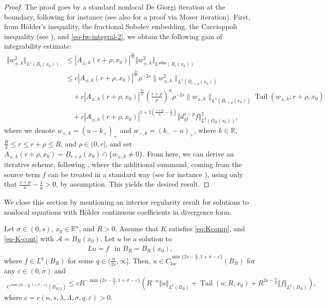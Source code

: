 \documentclass[11pt,reqno]{amsart}
\theoremstyle{plain}
\theoremstyle{definition}
\numberwithin{equation}{section}
\newcommand{\R}{\mathbb{R}}
\newcommand{\eps}{\varepsilon}
\newcommand{\1}{\mathbbm{1}}
\DeclareMathOperator{\tail}{Tail}
\begin{document}
\begin{proof}
    The proof goes by a standard nonlocal De Giorgi iteration at the boundary, following for instance \cite[Theorem~5]{KKP16} (see also \cite[Theorem~3.1]{KiLe23} for a proof via Moser iteration). First, from H\"older's inequality,  the fractional Sobolev embedding, the Caccioppoli inequality (see \cite[Lemma 4]{KKP16}), and \eqref{eq-fw-integral-2}, we obtain the following gain of integrability estimate:
    \begin{align*}
        \Vert w_{\pm,k}^2 \Vert_{L^{1}(B_{r}(x_0))} & \le |A_{\pm,k}(r+\rho,x_0)|^{\frac{2s}{n}} \Vert w_{\pm,k}^2 \Vert_{L^{\frac{n}{n-2s}}(B_{r}(x_0))} \\
        &\le c |A_{\pm,k}(r+\rho,x_0)|^{\frac{2s}{n}}  \rho^{-2s} \|w_{\pm,k}^2\|_{L^1(B_{r+\rho}(x_0))} \\
        &\quad + c |A_{\pm,k}(r+\rho,x_0)|^{\frac{2s}{n}}  \left( \frac{r+\rho}{\rho} \right)^{n} \rho^{-2s} \|w_{\pm,k}\|_{L^1(B_{r+\rho}(x_0))}\tail(w_{\pm,k};r+\rho,x_0) \\
        &\quad + c |A_{\pm,k}(r+\rho,x_0)|^{1+2 \left(\frac{s+p}{n}-\frac{1}{q} \right)} \Vert d^{s-p}_{\Omega} f \Vert_{L^q(\Omega_R(x_0))}^2,
    \end{align*}
    where we denote $w_{+,k} = (u - k_+)_+$ and $w_{-,k} = (k_- - u)_+$, where $k \in \R$, $\frac{R}{2} \le r \le r+\rho \le R$, and $\rho \in (0,r]$, and set $A_{\pm,k}(r+\rho,x_0) = B_{r+\rho}(x_0) \cap \{ w_{\pm,k} \not=0 \}$. From here, we can derive an iterative scheme, following \cite[Theorem~5]{KKP16}, where the additional summand, coming from the source term $f$ can be treated in a standard way (see for instance \cite[Chapter 11]{Sch20}), using only that $\frac{s+p}{n} - \frac{1}{q} > 0$, by assumption. This yields the desired result.
\end{proof}

We close this section by mentioning an interior regularity result for solutions to nonlocal equations with H\"older continuous coefficients in divergence form.

\begin{proposition}
\label{prop:interior-regularity}
Let $\sigma \in (0,s)$, $x_0 \in \R^n$, and $R > 0$. Assume that $K$ satisfies \eqref{eq:Kcomp}, and \eqref{eq-K-cont} with $\mathcal{A} = B_R(x_0)$.
Let $u$ be a solution to
\begin{align*}
Lu = f ~~ \text{ in } B_R=B_R(x_0),
\end{align*}
where $f \in L^q(B_R)$ for some $q \in (\frac{n}{2s}, \infty]$. Then, $u \in C^{ \min \{2s - \frac{n}{q} , 1 + \sigma - \eps \} }_{\mathrm{loc}}(B_R)$ for any $\varepsilon \in (0, \sigma)$ and
\begin{align*}
    [u]_{C^{ \min \{2s - \frac{n}{q} , 1 + \sigma - \eps \} }(\overline{B_{R/2}})} \le c R^{ - \min \{2s - \frac{n}{q} , 1 + \sigma - \eps \} } \left( R^{-n} \Vert u \Vert_{L^1(B_R)} + \tail(u;R,x_0) + R^{2s - \frac{n}{q}} \Vert f \Vert_{L^q(B_R)} \right),
\end{align*}
where $c=c(n,s,\lambda,\Lambda,\sigma,q,\eps) > 0$.
\end{proposition}
\end{document}
